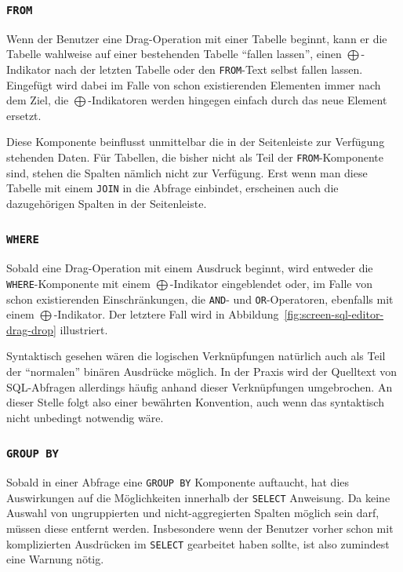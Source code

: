 \subsubsection{\texttt{FROM}}

Wenn der Benutzer eine Drag-Operation mit einer Tabelle beginnt, kann er die Tabelle wahlweise auf einer bestehenden Tabelle "`fallen lassen"', einen $\bigoplus$-Indikator nach der letzten Tabelle oder den \texttt{FROM}-Text selbst fallen lassen. Eingefügt wird dabei im Falle von schon existierenden Elementen immer nach dem Ziel, die $\bigoplus$-Indikatoren werden hingegen einfach durch das neue Element ersetzt.

Diese Komponente beinflusst unmittelbar die in der Seitenleiste zur Verfügung stehenden Daten. Für Tabellen, die bisher nicht als Teil der \texttt{FROM}-Komponente sind, stehen die Spalten nämlich nicht zur Verfügung. Erst wenn man diese Tabelle mit einem \texttt{JOIN} in die Abfrage einbindet, erscheinen auch die dazugehörigen Spalten in der Seitenleiste.

\subsubsection{\texttt{WHERE}}

Sobald eine Drag-Operation mit einem Ausdruck beginnt, wird entweder die \texttt{WHERE}-Komponente mit einem $\bigoplus$-Indikator eingeblendet oder, im Falle von schon existierenden Einschränkungen, die \texttt{AND}- und \texttt{OR}-Operatoren, ebenfalls mit einem $\bigoplus$-Indikator. Der letztere Fall wird in Abbildung~\ref{fig:screen-sql-editor-drag-drop} illustriert.

Syntaktisch gesehen wären die logischen Verknüpfungen natürlich auch als Teil der "`normalen"' binären Ausdrücke möglich. In der Praxis wird der Quelltext von SQL-Abfragen allerdings häufig anhand dieser Verknüpfungen umgebrochen. An dieser Stelle folgt \idename also einer bewährten Konvention, auch wenn das syntaktisch nicht unbedingt notwendig wäre.

\subsubsection{\texttt{GROUP BY}}

Sobald in einer Abfrage eine \texttt{GROUP BY} Komponente auftaucht, hat dies Auswirkungen auf die Möglichkeiten innerhalb der \texttt{SELECT} Anweisung. Da keine Auswahl von ungruppierten und nicht-aggregierten Spalten möglich sein darf, müssen diese entfernt werden. Insbesondere wenn der Benutzer vorher schon mit komplizierten Ausdrücken im \texttt{SELECT} gearbeitet haben sollte, ist also zumindest eine Warnung nötig.

